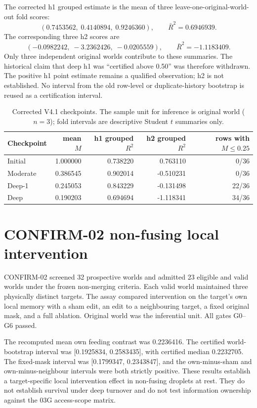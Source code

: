 \documentclass[10pt]{article}
\begin{document}
The corrected h1 grouped estimate is the mean of three leave-one-original-world-out fold scores:
\[
(0.7453562,\;0.4140894,\;0.9246360),\qquad \bar R^2=0.6946939.
\]
The corresponding three h2 scores are
\[
(-0.0982242,\;-3.2362426,\;-0.0205559),\qquad \bar R^2=-1.1183409.
\]
Only three independent original worlds contribute to these summaries. The historical claim that deep h1 was ``certified above 0.50'' was therefore withdrawn. The positive h1 point estimate remains a qualified observation; h2 is not established. No interval from the old row-level or duplicate-history bootstrap is reused as a certification interval.

\begin{table}[ht]
\centering
\caption{Corrected V4.1 checkpoints. The sample unit for inference is original world ($n=3$); fold intervals are descriptive Student $t$ summaries only.}
\begin{tabular}{lrrrr}
\toprule
Checkpoint & mean $M$ & h1 grouped $R^2$ & h2 grouped $R^2$ & rows with $M\leq0.25$ \\
\midrule
Initial & 1.000000 & 0.738220 & 0.763110 & 0/36 \\
Moderate & 0.386545 & 0.902014 & -0.510231 & 0/36 \\
Deep-1 & 0.245053 & 0.843229 & -0.131498 & 22/36 \\
Deep & 0.190203 & 0.694694 & -1.118341 & 34/36 \\
\bottomrule
\end{tabular}
\end{table}

\section{CONFIRM-02 non-fusing local intervention}

CONFIRM-02 screened 32 prospective worlds and admitted 23 eligible and valid worlds under the frozen non-merging criteria. Each valid world maintained three physically distinct targets. The assay compared intervention on the target's own local memory with a sham edit, an edit to a neighbouring target, a fixed original mask, and a full ablation. Original world was the inferential unit. All gates G0--G6 passed.

The recomputed mean own feeding contrast was 0.2236416. The certified world-bootstrap interval was [0.1925834, 0.2583435], with certified median 0.2232705. The fixed-mask interval was [0.1799347, 0.2343847], and the own-minus-sham and own-minus-neighbour intervals were both strictly positive. These results establish a target-specific local intervention effect in non-fusing droplets at rest. They do not establish survival under deep turnover and do not test information ownership against the 03G access-scope matrix.
\end{document}
